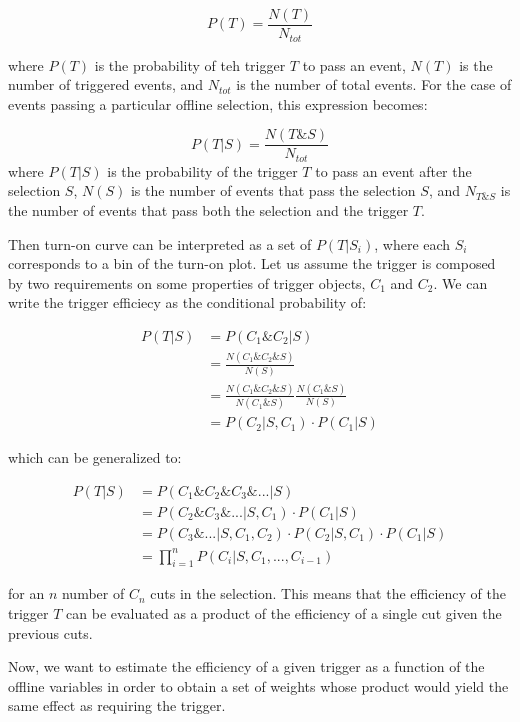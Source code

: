 \begin{equation}
P(T) = \frac{N(T)}{N_{tot}}
\end{equation}

where $P(T)$ is the probability of teh trigger $T$ to pass an event, $N(T)$ is the number of triggered events, and $N_{tot}$ is the number of total events. For the case of events passing a particular offline selection, this expression becomes:

\begin{equation}
P(T|S) = \frac{N(T\&S)}{N_{tot}}
\end{equation}
where $P(T|S)$ is the probability of the trigger $T$ to pass an event after the selection $S$, $N(S)$ is the number of events that pass the selection $S$, and $N_{T\&S}$ is the number of events that pass both the selection and the trigger $T$.

Then turn-on curve can be interpreted as a set of $P(T|S_{i})$, where each $S_{i}$ corresponds to a bin of the turn-on plot. Let us assume the trigger is composed by two requirements on some properties of trigger objects, $C_{1}$ and $C_{2}$. We can write the trigger efficiecy as the conditional probability of:

\begin{align}
P(T|S) &= P(C_{1}\&C_{2}|S)\\
&=\frac{N(C_{1}\&C_{2}\&S)}{N(S)}\\
&=\frac{N(C_{1}\&C_{2}\&S)}{N(C_{1}\&S)} \frac{N(C_{1}\&S)}{N(S)}\\
&=P(C_{2}|S,C_{1})\cdot P(C_{1}|S)
\end{align}

which can be generalized to:

\begin{align}
P(T|S) &= P(C_{1}\&C_{2}\&C_{3}\&...|S)\\
&=P(C_{2}\&C_{3}\&...|S,C_{1})\cdot P(C_{1}|S)\\
&=P(C_{3}\&...|S,C_{1},C_{2})\cdot P(C_{2}|S,C_{1})\cdot P(C_{1}|S)\\	
&=\prod_{i=1}^{n} P(C_{i}|S,C_{1},...,C_{i-1})
\end{align}

for an $n$ number of $C_{n}$ cuts in the selection. This means that the efficiency of the trigger $T$ can be evaluated as a product of the efficiency of a single cut given the previous cuts.

Now, we want to estimate the efficiency of a given trigger as a function of the offline variables in order to obtain a set of weights whose product would yield the same effect as requiring the trigger.

